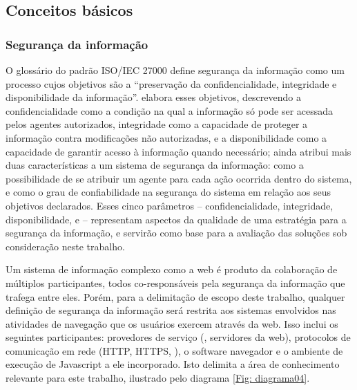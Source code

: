 \subsection{Conceitos básicos}

\subsubsection{Segurança da informação}
O glossário do padrão ISO/IEC 27000 \cite{ISO2016} define segurança da informação como um processo cujos objetivos são a ``preservação da confidencialidade, integridade e disponibilidade da informação''.  elabora esses objetivos, descrevendo a confidencialidade como a condição na qual a informação só pode ser acessada pelos agentes autorizados, integridade como a capacidade de proteger a informação contra modificações não autorizadas, e a disponibilidade como a capacidade de garantir acesso à informação quando necessário;  ainda atribui mais duas características a um sistema de segurança da informação:  como a possibilidade de se atribuir um agente para cada ação ocorrida dentro do sistema, e  como o grau de confiabilidade na segurança do sistema em relação aos seus objetivos declarados. Esses cinco parâmetros -- confidencialidade, integridade, disponibilidade,  e  -- representam aspectos da qualidade de uma estratégia para a segurança da informação, e servirão como base para a avaliação das soluções sob consideração neste trabalho.

Um sistema de informação complexo como a web é produto da colaboração de múltiplos participantes, todos co-responsáveis pela segurança da informação que trafega entre eles. Porém, para a delimitação de escopo deste trabalho, qualquer definição de segurança da informação será restrita aos sistemas envolvidos nas atividades de navegação que os usuários exercem através da web. Isso inclui os seguintes participantes: provedores de serviço (, servidores da web), protocolos de comunicação em rede (HTTP, HTTPS, ), o software navegador e o ambiente de execução de Javascript a ele incorporado. Isto delimita a área de conhecimento relevante para este trabalho, ilustrado pelo diagrama \ref{Fig: diagrama04}.

